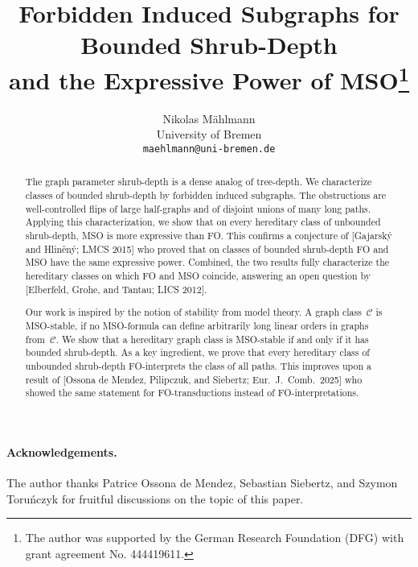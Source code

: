 \documentclass[11pt]{article}      \usepackage[margin=1in]{geometry}  \usepackage{microtype}
\theoremstyle{definition}
\newcommand{\CC}{\mathcal{C}}
\begin{document}
\newcommand{\funding}{
The author was supported by the German Research Foundation (DFG) with grant agreement No. 444419611.
}


\title{Forbidden Induced Subgraphs for Bounded Shrub-Depth\\ and the Expressive Power of MSO\thanks{\funding}}
\date{}
\author{
  Nikolas M\"ahlmann \\
  \small{University of Bremen} \\
  \small{\texttt{maehlmann@uni-bremen.de}}
}
\maketitle

\begin{abstract}
  The graph parameter shrub-depth is a dense analog of tree-depth.
  We characterize classes of bounded shrub-depth by forbidden induced subgraphs.
  The obstructions are well-controlled flips of large half-graphs and of disjoint unions of many long paths.
  Applying this characterization, we show that on every hereditary class of unbounded shrub-depth, MSO is more expressive than FO.
  This confirms a conjecture of 
  [Gajarsk{\'{y}} and Hlin{\v{e}}n{\'{y}}; LMCS 2015] who proved that on classes of bounded shrub-depth FO and MSO have the same expressive power.
  Combined, the two results fully characterize the hereditary classes on which FO and MSO coincide, answering an open question by [Elberfeld, Grohe, and Tantau; LICS 2012].

  Our work is inspired by the notion of stability from model theory.
  A graph class~$\CC$ is MSO-stable, if   no MSO-formula can define arbitrarily long linear orders in graphs from~$\CC$.
  We show that a hereditary graph class is MSO-stable if and only if it has bounded shrub-depth.
  As a key ingredient, we prove that every hereditary class of unbounded shrub-depth FO-interprets the class of all paths.
  This improves upon a result of [Ossona de Mendez, Pilipczuk, and Siebertz; Eur.\ J.\ Comb.\ 2025] who showed the same statement for FO-transductions instead of FO-interpretations.
\end{abstract}

\paragraph*{Acknowledgements.}
The author thanks Patrice Ossona de Mendez, Sebastian Siebertz, and Szymon Toru\'nczyk for fruitful discussions on the topic of this paper.
\end{document}
